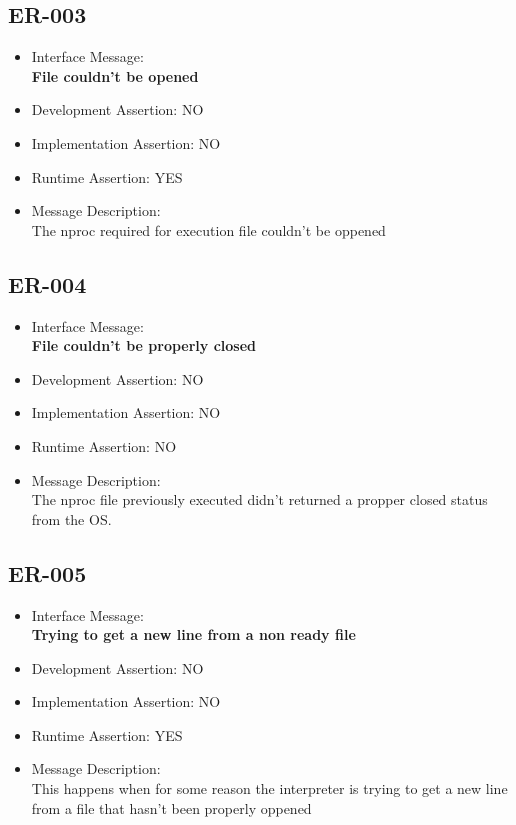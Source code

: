 \subsection{ER-003}
\begin{itemize}
  \item Interface Message:\\[1em]
    \textbf{File couldn't be opened}
  \item Development Assertion: NO
  \item Implementation Assertion: NO
  \item Runtime Assertion: YES
  \item Message Description:\\[1em]
    The nproc required for execution file couldn't be oppened
\end{itemize}

\subsection{ER-004}
\begin{itemize}
  \item Interface Message:\\[1em]
    \textbf{File couldn't be properly closed}
  \item Development Assertion: NO
  \item Implementation Assertion: NO
  \item Runtime Assertion: NO
  \item Message Description:\\[1em]
    The nproc file previously executed didn't returned a propper closed status from the OS.
\end{itemize}

\subsection{ER-005}
\begin{itemize}
  \item Interface Message:\\[1em]
    \textbf{Trying to get a new line from a non ready file}
  \item Development Assertion: NO
  \item Implementation Assertion: NO
  \item Runtime Assertion: YES
  \item Message Description:\\[1em]
    This happens when for some reason the interpreter is trying to get a new line from a file that hasn't been properly oppened
\end{itemize}

